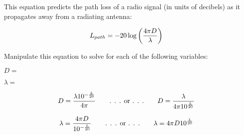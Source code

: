 

This equation predicts the path loss of a radio signal (in units of decibels) as it propagates away from a radiating antenna:

$$L_{path} = -20 \log \left(4 \pi D \over \lambda \right)$$

Manipulate this equation to solve for each of the following variables:

\vskip 10pt

$D =$

\vskip 10pt

$\lambda =$

\vskip 10pt







$$D = {\lambda 10^{-{L \over 20}} \over 4 \pi} \hskip 20pt \hbox{. . . or . . .} \hskip 20pt D = {\lambda \over 4 \pi 10^{L \over 20}}$$

\vskip 20pt

$$\lambda = {4 \pi D \over 10^{-{L \over 20}}} \hskip 20pt \hbox{. . . or . . .} \hskip 20pt \lambda = 4 \pi D 10^{L \over 20}$$












